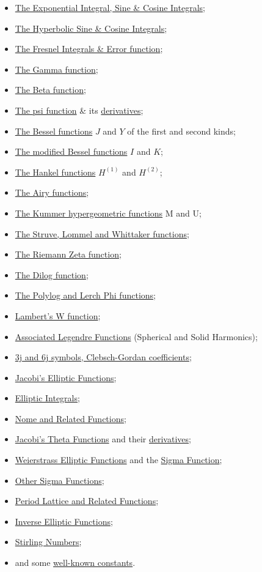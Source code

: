 \begin{itemize}
\item \hyperlink{INTEGF}{The Exponential Integral, Sine \& Cosine Integrals};
\item \hyperlink{INTEGF}{The Hyperbolic Sine \& Cosine Integrals};
\item \hyperlink{INTEGF}{The Fresnel Integrals \& Error function};
\item \hyperlink{GAMMF}{The Gamma function};
\item \hyperlink{BETAF}{The Beta function};
\item \hyperlink{DIGAM}{The psi function} \& its \hyperlink{POLYGAM}{derivatives};
\item \hyperlink{BESSELF}{The Bessel functions} $J$ and $Y$ of the first and second kinds;
\item \hyperlink{BESSELF}{The modified Bessel functions} $I$ and $K$;
\item \hyperlink{BESSELF}{The Hankel functions} $H^{(1)}$ and $H^{(2)}$;
\item \hyperlink{AIRYF}{The Airy functions};
\item \hyperlink{HYPERGEOM}{The Kummer hypergeometric functions} M and U;
\item \hyperlink{HYPERGEOM}{The Struve, Lommel and Whittaker functions};
\item \hyperlink{RIEMZETA}{The Riemann Zeta function};
\item \hyperlink{POLYLOG}{The Dilog function};
\item \hyperlink{POLYLOG}{The Polylog and Lerch Phi functions};
\item \hyperlink{LAMBERTW}{Lambert's W function};
\item \hyperlink{SPHSOLH}{Associated Legendre Functions}
(Spherical and Solid Harmonics);
\item \hyperlink{CLEBSCHG}{3j and 6j symbols, Clebsch-Gordan coefficients};
\item \hyperlink{JACEF}{Jacobi's Elliptic Functions};
\item \hyperlink{ELLIPI}{Elliptic Integrals};
\item \hyperlink{ELLIPNOME}{Nome and Related Functions};
\item \hyperlink{JACTF}{Jacobi's Theta Functions} and their
\hyperlink{THETAD}{ derivatives};
\item \hyperlink{WEIERSTRASS}{Weierstrass Elliptic Functions} and the
\hyperlink{SIGMA}{Sigma Function};
\item \hyperlink{SIGMA1}{Other Sigma Functions};
\item \hyperlink{ETA}{Period Lattice and Related Functions};
\item \hyperlink{INVELL}{Inverse Elliptic Functions};  
\item \hyperlink{STIRL}{Stirling Numbers};
\item and some \hyperlink{CONSTS}{well-known constants}.
\end{itemize}

